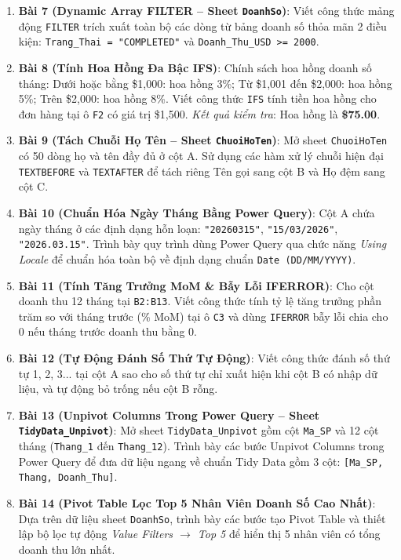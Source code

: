 \begin{baitapbox}
\begin{enumerate}
    \item \textbf{Bài 7 (Dynamic Array FILTER -- Sheet \texttt{DoanhSo})}: Viết công thức mảng động \texttt{FILTER} trích xuất toàn bộ các dòng từ bảng doanh số thỏa mãn 2 điều kiện: \texttt{Trang\_Thai = "COMPLETED"} và \texttt{Doanh\_Thu\_USD >= 2000}.
    \item \textbf{Bài 8 (Tính Hoa Hồng Đa Bậc IFS)}: Chính sách hoa hồng doanh số tháng: Dưới hoặc bằng \$1,000: hoa hồng 3\%; Từ \$1,001 đến \$2,000: hoa hồng 5\%; Trên \$2,000: hoa hồng 8\%. Viết công thức \texttt{IFS} tính tiền hoa hồng cho đơn hàng tại ô \texttt{F2} có giá trị \$1,500. \textit{Kết quả kiểm tra}: Hoa hồng là \textbf{\$75.00}.
    \item \textbf{Bài 9 (Tách Chuỗi Họ Tên -- Sheet \texttt{ChuoiHoTen})}: Mở sheet \texttt{ChuoiHoTen} có 50 dòng họ và tên đầy đủ ở cột A. Sử dụng các hàm xử lý chuỗi hiện đại \texttt{TEXTBEFORE} và \texttt{TEXTAFTER} để tách riêng Tên gọi sang cột B và Họ đệm sang cột C.
    \item \textbf{Bài 10 (Chuẩn Hóa Ngày Tháng Bằng Power Query)}: Cột A chứa ngày tháng ở các định dạng hỗn loạn: \texttt{"20260315"}, \texttt{"15/03/2026"}, \texttt{"2026.03.15"}. Trình bày quy trình dùng Power Query qua chức năng \textit{Using Locale} để chuẩn hóa toàn bộ về định dạng chuẩn \texttt{Date (DD/MM/YYYY)}.
    \item \textbf{Bài 11 (Tính Tăng Trưởng MoM \& Bẫy Lỗi IFERROR)}: Cho cột doanh thu 12 tháng tại \texttt{B2:B13}. Viết công thức tính tỷ lệ tăng trưởng phần trăm so với tháng trước (\% MoM) tại ô \texttt{C3} và dùng \texttt{IFERROR} bẫy lỗi chia cho 0 nếu tháng trước doanh thu bằng 0.
    \item \textbf{Bài 12 (Tự Động Đánh Số Thứ Tự Động)}: Viết công thức đánh số thứ tự 1, 2, 3... tại cột A sao cho số thứ tự chỉ xuất hiện khi cột B có nhập dữ liệu, và tự động bỏ trống nếu cột B rỗng.
    \item \textbf{Bài 13 (Unpivot Columns Trong Power Query -- Sheet \texttt{TidyData\_Unpivot})}: Mở sheet \texttt{TidyData\_Unpivot} gồm cột \texttt{Ma\_SP} và 12 cột tháng (\texttt{Thang\_1} đến \texttt{Thang\_12}). Trình bày các bước Unpivot Columns trong Power Query để đưa dữ liệu ngang về chuẩn Tidy Data gồm 3 cột: \texttt{[Ma\_SP, Thang, Doanh\_Thu]}.
    \item \textbf{Bài 14 (Pivot Table Lọc Top 5 Nhân Viên Doanh Số Cao Nhất)}: Dựa trên dữ liệu sheet \texttt{DoanhSo}, trình bày các bước tạo Pivot Table và thiết lập bộ lọc tự động \textit{Value Filters $\rightarrow$ Top 5} để hiển thị 5 nhân viên có tổng doanh thu lớn nhất.

\end{enumerate}
\end{baitapbox}
